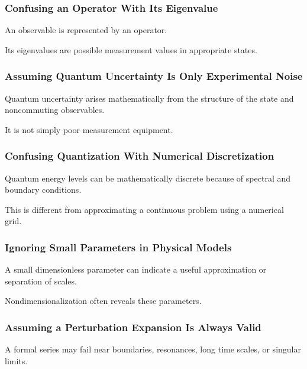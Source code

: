 \subsubsection{Confusing an Operator With Its Eigenvalue}

An observable is represented by an operator.

Its eigenvalues are possible measurement values in appropriate states.

\subsubsection{Assuming Quantum Uncertainty Is Only Experimental Noise}

Quantum uncertainty arises mathematically from the structure of the state
and noncommuting observables.

It is not simply poor measurement equipment.

\subsubsection{Confusing Quantization With Numerical Discretization}

Quantum energy levels can be mathematically discrete because of spectral and
boundary conditions.

This is different from approximating a continuous problem using a numerical
grid.

\subsubsection{Ignoring Small Parameters in Physical Models}

A small dimensionless parameter can indicate a useful approximation or
separation of scales.

Nondimensionalization often reveals these parameters.

\subsubsection{Assuming a Perturbation Expansion Is Always Valid}

A formal series may fail near boundaries, resonances, long time scales, or
singular limits.

